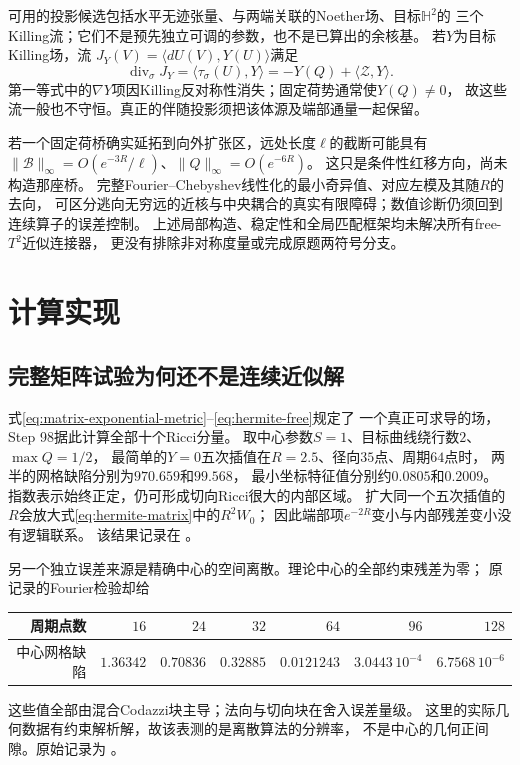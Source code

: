 \documentclass[UTF8,a4paper,11pt,fontset=fandol]{ctexart}
\numberwithin{equation}{section}
\theoremstyle{definition}
\begin{document}
可用的投影候选包括水平无迹张量、与两端关联的Noether场、目标$\mathbb H^2$的
三个Killing流；它们不是预先独立可调的参数，也不是已算出的余核基。
若$Y$为目标Killing场，流
$J_Y(V)=\langle dU(V),Y(U)\rangle$满足
\[
 \operatorname{div}_\sigma J_Y
 =\langle\tau_\sigma(U),Y\rangle
 =-Y(Q)+\langle\mathscr Z,Y\rangle.
\]
第一等式中的$\nabla Y$项因Killing反对称性消失；固定荷势通常使$Y(Q)\ne0$，
故这些流一般也不守恒。真正的伴随投影须把该体源及端部通量一起保留。

若一个固定荷桥确实延拓到向外扩张区，远处长度$\ell$的截断可能具有
$\|\mathscr B\|_\infty=O(e^{-3R}/\ell)$、$\|Q\|_\infty=O(e^{-6R})$。
这只是条件性红移方向，尚未构造那座桥。
完整Fourier--Chebyshev线性化的最小奇异值、对应左模及其随$R$的去向，
可区分逃向无穷远的近核与中央耦合的真实有限障碍；数值诊断仍须回到连续算子的误差控制。
上述局部构造、稳定性和全局匹配框架均未解决所有free-$T^2$近似连接器，
更没有排除非对称度量或完成原题两符号分支。

\section{计算实现}
\subsection{完整矩阵试验为何还不是连续近似解}\label{sec:matrix-pressure-test}
式\eqref{eq:matrix-exponential-metric}--\eqref{eq:hermite-free}规定了
一个真正可求导的场，Step 98据此计算全部十个Ricci分量。
取中心参数$S=1$、目标曲线绕行数$2$、$\max Q=1/2$，
最简单的$Y=0$五次插值在$R=2.5$、径向$35$点、周期$64$点时，
两半的网格缺陷分别为$970.659$和$99.568$，
最小坐标特征值分别约$0.0805$和$0.2009$。
指数表示始终正定，仍可形成切向Ricci很大的内部区域。
扩大同一个五次插值的$R$会放大式\eqref{eq:hermite-matrix}中的$R^2W_0$；
因此端部项$e^{-2R}$变小与内部残差变小没有逻辑联系。
该结果记录在
。

另一个独立误差来源是精确中心的空间离散。理论中心的全部约束残差为零；
原记录的Fourier检验却给
\begin{center}
\begin{tabular}{rrrrrrr}
\toprule 周期点数 & $16$ & $24$ & $32$ & $64$ & $96$ & $128$\\\midrule
中心网格缺陷 & $1.36342$ & $0.70836$ & $0.32885$ &
$0.0121243$ & $3.0443\,10^{-4}$ & $6.7568\,10^{-6}$\\\bottomrule
\end{tabular}
\end{center}
这些值全部由混合Codazzi块主导；法向与切向块在舍入误差量级。
这里的实际几何数据有约束解析解，故该表测的是离散算法的分辨率，
不是中心的几何正间隙。原始记录为
。
\end{document}
